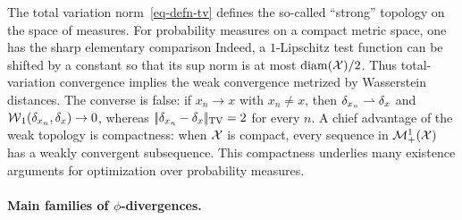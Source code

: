 \begin{rem}
		The total variation norm~\eqref{eq-defn-tv} defines the so-called ``strong'' topology on the space of measures.
	For probability measures on a compact metric space, one has the sharp elementary comparison
	Indeed, a $1$-Lipschitz test function can be shifted by a constant so that its sup norm is at most $\operatorname{diam}(\mathcal{X})/2$. Thus total-variation convergence implies the weak convergence metrized by Wasserstein distances.
	The converse is false: if $x_n\to x$ with $x_n\neq x$, then $\delta_{x_n}\rightharpoonup\delta_x$ and $\operatorname{\mathcal{W}}_1(\delta_{x_n},\delta_x)\to0$, whereas $|\!| \delta_{x_n}-\delta_x |\!|_{\operatorname{TV}}=2$ for every $n$.
	A chief advantage of the weak topology is compactness: when $\mathcal{X}$ is compact, every sequence in $\mathcal{M}_+^1(\mathcal{X})$ has a weakly convergent subsequence. This compactness underlies many existence arguments for optimization over probability measures.
\end{rem}


\paragraph{Main families of $\phi$-divergences.}

